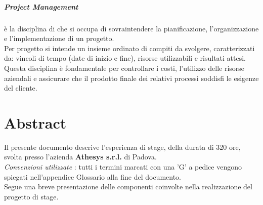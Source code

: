 \documentclass[12pt,a4paper,twoside,openany,english]{book}
\begin{document}
\paragraph*{Project Management}
è la disciplina di che si occupa di sovraintendere la pianificazione, l'organizzazione e l'implementazione di un progetto.\\ Per progetto si intende un insieme ordinato di compiti da svolgere, caratterizzati da: vincoli di tempo (date di inizio e fine), risorse utilizzabili e risultati attesi.\\
Questa disciplina è fondamentale per controllare i costi, l'utilizzo delle risorse aziendali e assicurare che il prodotto finale dei relativi processi soddisfi le esigenze del cliente.\\

\chapter*{Abstract}\label{abstract}
	Il presente documento descrive l'esperienza di stage, della durata di 320 ore, svolta presso l'azienda \textbf{Athesys s.r.l.} di Padova.\\
	
	\textit{Convenzioni utilizzate} : tutti i termini marcati con una 'G' a
	pedice vengono spiegati nell'appendice Glossario alla fine del documento.\\

	Segue una breve presentazione delle componenti coinvolte nella realizzazione del progetto di stage.
	
\end{document}
